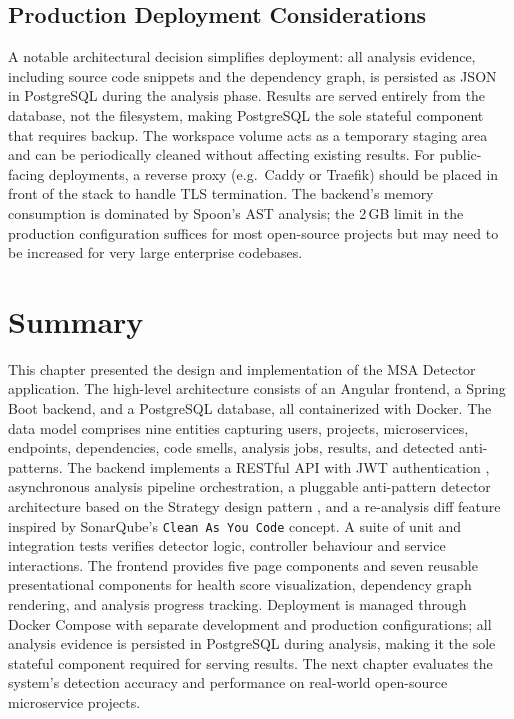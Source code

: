 \subsection{Production Deployment Considerations}
\label{subsec:prod-deployment}

\par A notable architectural decision simplifies deployment: all analysis evidence, including source code snippets and the dependency graph, is persisted as JSON in PostgreSQL during the analysis phase. Results are served entirely from the database, not the filesystem, making PostgreSQL the sole stateful component that requires backup. The workspace volume acts as a temporary staging area and can be periodically cleaned without affecting existing results. For public-facing deployments, a reverse proxy (e.g.\ Caddy or Traefik) should be placed in front of the stack to handle TLS termination. The backend's memory consumption is dominated by Spoon's AST analysis; the 2\,GB limit in the production configuration suffices for most open-source projects but may need to be increased for very large enterprise codebases.

\section{Summary}
\label{sec:ch4-summary}

\par This chapter presented the design and implementation of the MSA Detector application. The high-level architecture consists of an Angular frontend, a Spring Boot backend, and a PostgreSQL database, all containerized with Docker. The data model comprises nine entities capturing users, projects, microservices, endpoints, dependencies, code smells, analysis jobs, results, and detected anti-patterns. The backend implements a RESTful API \cite{Fielding2000} with JWT authentication \cite{RFC7519}, asynchronous analysis pipeline orchestration, a pluggable anti-pattern detector architecture based on the Strategy design pattern \cite{Gamma1994}, and a re-analysis diff feature inspired by SonarQube's \texttt{Clean As You Code} concept. A suite of unit and integration tests verifies detector logic, controller behaviour and service interactions. The frontend provides five page components and seven reusable presentational components for health score visualization, dependency graph rendering, and analysis progress tracking. Deployment is managed through Docker Compose with separate development and production configurations; all analysis evidence is persisted in PostgreSQL during analysis, making it the sole stateful component required for serving results. The next chapter evaluates the system's detection accuracy and performance on real-world open-source microservice projects.
